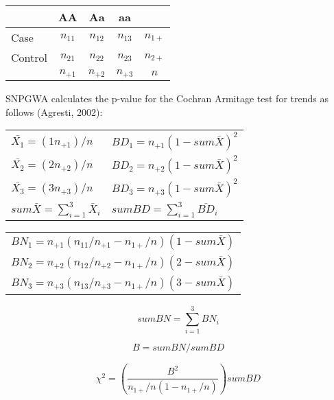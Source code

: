 \begin{enumerate}
\begin{center}
  \begin{tabular}{lcccc}
    \hline
    {} & \textbf{AA} & \textbf{Aa} & \textbf{aa} & {} \\
    \hline
    Case & $n_{11}$ & $n_{12}$ & $n_{13}$ & $n_{1+}$ \\
    Control & $n_{21}$ & $n_{22}$ & $n_{23}$ & $n_{2+}$ \\
    {}   & $n_{+1}$ & $n_{+2}$ & $n_{+3}$  & $n$ \\
    \hline
  \end{tabular}
\end{center}

SNPGWA calculates the p-value for the Cochran Armitage test for trends as
follows (Agresti, 2002):

\begin{center}
  \begin{tabular}{ll}
    $\bar{X_1} = (1n_{+1})/n$ &  $BD_1 = n_{+1}(1-sum\bar{X})^2$ \\
    $\bar{X_2} = (2n_{+2})/n$ &  $BD_2 = n_{+2}(1-sum\bar{X})^2$ \\
    $\bar{X_3} = (3n_{+3})/n$ &  $BD_3 = n_{+3}(1-sum\bar{X})^2$ \\
    $sum\bar{X} = \sum_{i=1}^3\bar{X}_i$ & $sumBD = \sum_{i=1}^3\overline{BD}_i$ \\
  \end{tabular}
\end{center}
\vspace{1em}

\begin{center}
  \begin{tabular}{c}
    $BN_1 = n_{+1}(n_{11}/n_{+1} -n_{1+}/n)(1-sum\bar{X})$ \\
    $BN_2 = n_{+2}(n_{12}/n_{+2} -n_{1+}/n)(2-sum\bar{X})$ \\
    $BN_3 = n_{+3}(n_{13}/n_{+3} -n_{1+}/n)(3-sum\bar{X})$ \\
  \end{tabular}
\end{center}

\begin{equation*}
  sumBN = \sum_{i=1}^3BN_i
\end{equation*}

\vspace{1em}
\begin{equation*}
  B = sumBN/sumBD
\end{equation*}

\begin{equation*}
  \chi^2 = \left(\frac{B^2}{n_{1+}/n(1-n_{1+}/n)}\right)sumBD
\end{equation*}


\end{enumerate}
